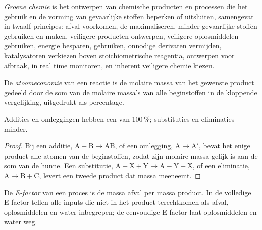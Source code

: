 \begin{definition}\label{def:b3:green-industrial:green-chemistry}
\emph{Groene chemie} is het ontwerpen van chemische
producten en processen die het gebruik en de vorming van gevaarlijke
stoffen beperken of uitsluiten, samengevat in twaalf principes: afval
voorkomen, de  maximaliseren, minder gevaarlijke stoffen
gebruiken en maken, veiligere producten ontwerpen, veiligere
oplosmiddelen gebruiken, energie besparen, 
gebruiken, onnodige derivaten vermijden, katalysatoren verkiezen boven
stoichiometrische reagentia, ontwerpen voor afbraak, in real time
monitoren, en inherent veiligere chemie kiezen.
\end{definition}

\begin{definition}[Atoomeconomie]\label{def:b3:green-industrial:atom-economy}
De \emph{atoomeconomie} van een reactie is de
molaire massa van het gewenste product gedeeld door de som van de molaire
massa's van alle beginstoffen in de kloppende vergelijking, uitgedrukt
als percentage.
\end{definition}

\begin{proposition}\label{prop:b3:green-industrial:ae-classes}
Addities en omleggingen hebben een  van 100\,\%; substituties
en eliminaties minder.
\end{proposition}

\begin{proof}
Bij een additie, $\mathrm{A} + \mathrm{B} \to \mathrm{AB}$, of een omlegging, $\mathrm{A} \to \mathrm{A'}$, bevat het enige product alle
atomen van de beginstoffen, zodat zijn molaire massa gelijk is aan de som
van de hunne. Een
substitutie, $\mathrm{A{-}X} + \mathrm{Y} \to \mathrm{A{-}Y} + \mathrm{X}$, of een eliminatie, $\mathrm{A} \to \mathrm{B} + \mathrm{C}$, levert een
tweede product dat massa meeneemt.
\end{proof}

\begin{definition}[E-factor]\label{def:b3:green-industrial:e-factor}
De \emph{E-factor} van een proces is de massa afval per
massa product. In de volledige E-factor tellen alle inputs die niet in
het product terechtkomen als afval, oplosmiddelen en water inbegrepen; de
eenvoudige E-factor laat oplosmiddelen en water weg.
\end{definition}

